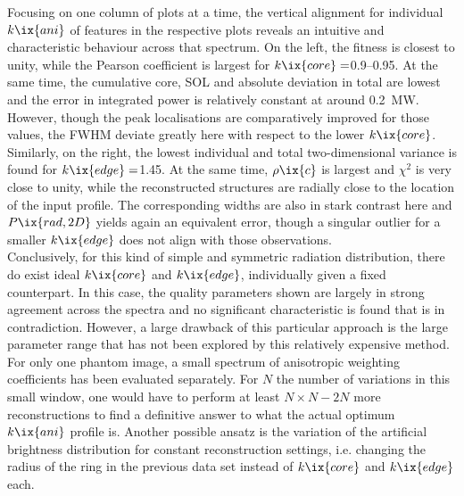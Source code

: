                 Focusing on one column of plots at a time, the vertical alignment for individual $k\ix{ani}$ of features in the respective plots reveals an intuitive and characteristic behaviour across that spectrum. On the left, the fitness is closest to unity, while the Pearson coefficient is largest for $k\ix{core}=$\SIrange{0.9}{0.95}{\arbitraryunit}. At the same time, the cumulative core, SOL and absolute deviation in total are lowest and the error in integrated power is relatively constant at around \SI{0.2}{\mega\watt}. However, though the peak localisations are comparatively improved for those values, the FWHM deviate greatly here with respect to the lower $k\ix{core}$. Similarly, on the right, the lowest individual and total two-dimensional variance is found for $k\ix{edge}=$\SI{1.45}{\arbitraryunit}. At the same time, $\rho\ix{c}$ is largest and $\chi^{2}$ is very close to unity, while the reconstructed structures are radially close to the location of the input profile. The corresponding widths are also in stark contrast here and $P\ix{rad,2D}$ yields again an equivalent error, though a singular outlier for a smaller $k\ix{edge}$ does not align with those observations.\\%
                Conclusively, for this kind of simple and symmetric radiation distribution, there do exist ideal $k\ix{core}$ and $k\ix{edge}$, individually given a fixed counterpart. In this case, the quality parameters shown are largely in strong agreement across the spectra and no significant characteristic is found that is in contradiction. However, a large drawback of this particular approach is the large parameter range that has not been explored by this relatively expensive method. For only one phantom image, a small spectrum of anisotropic weighting coefficients has been evaluated separately. For $N$ the number of variations in this small window, one would have to perform at least $N\times N-2N$ more reconstructions to find a definitive answer to what the actual optimum $k\ix{ani}$ profile is. Another possible ansatz is the variation of the artificial brightness distribution for constant reconstruction settings, i.e. changing the radius of the ring in the previous data set instead of $k\ix{core}$ and $k\ix{edge}$ each.\\%
%
